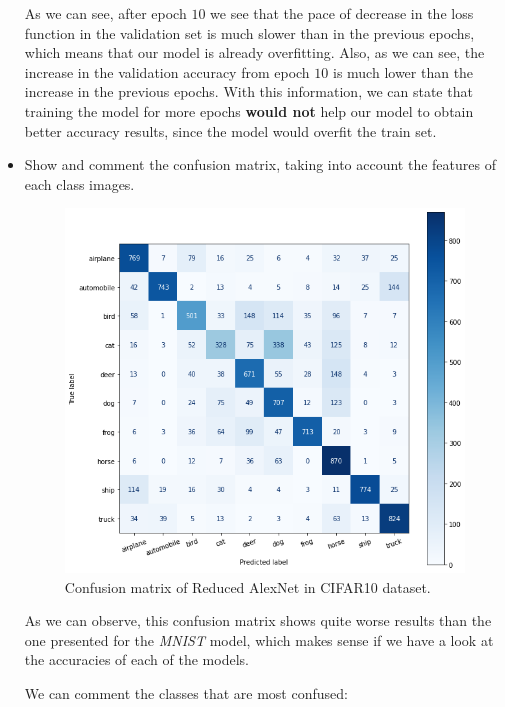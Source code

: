 \documentclass[a4paper]{article}
\begin{document}
\begin{itemize}
        As we can see, after epoch \(10\) we see that the pace of decrease in the loss function in the validation set is much slower than in the previous epochs, which means that our model is already overfitting. Also, as we can see, the increase in the validation accuracy from epoch \(10\) is much lower than the increase in the previous epochs. With this information, we can state that training the model for more epochs \textbf{would not} help our model to obtain better accuracy results, since the model would overfit  the train set.

  \item Show and comment the confusion matrix, taking into account the features of each class images.\\
        \begin{figure}[H]
          \centering
          \includegraphics[scale = 0.4]{Figures/AlexNet-Confusion.png}
          \caption{Confusion matrix of Reduced AlexNet in CIFAR10 dataset.}
        \end{figure}

        As we can observe, this confusion matrix shows quite worse results than the one presented for the \emph{MNIST} model, which makes sense if we have a look at the accuracies of each of the models.

        We can comment the classes that are most confused:


\end{itemize}
\end{document}
